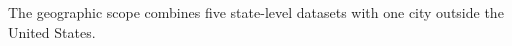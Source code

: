 
The geographic scope combines five state-level datasets with one city outside the
United States.
%

